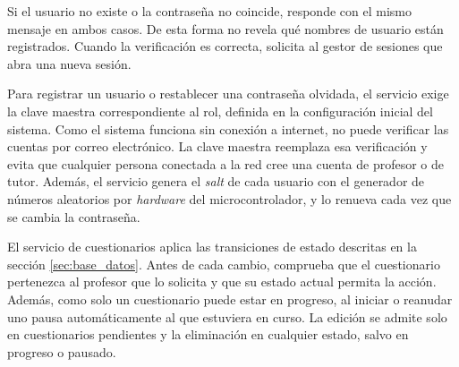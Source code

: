 Si el usuario no existe o la contraseña no coincide, responde con el mismo mensaje en ambos casos. De esta forma no revela qué nombres de usuario están registrados. Cuando la verificación es correcta, solicita al gestor de sesiones que abra una nueva sesión.



Para registrar un usuario o restablecer una contraseña olvidada, el servicio exige la clave maestra correspondiente al rol, definida en la configuración inicial del sistema. Como el sistema funciona sin conexión a internet, no puede verificar las cuentas por correo electrónico. La clave maestra reemplaza esa verificación y evita que cualquier persona conectada a la red cree una cuenta de profesor o de tutor. Además, el servicio genera el \emph{salt} de cada usuario con el generador de números aleatorios por \emph{hardware} del microcontrolador, y lo renueva cada vez que se cambia la contraseña.




El servicio de cuestionarios aplica las transiciones de estado descritas en la sección \ref{sec:base_datos}. Antes de cada cambio, comprueba que el cuestionario pertenezca al profesor que lo solicita y que su estado actual permita la acción. Además, como solo un cuestionario puede estar en progreso, al iniciar o reanudar uno pausa automáticamente al que estuviera en curso. La edición se admite solo en cuestionarios pendientes y la eliminación en cualquier estado, salvo en progreso o pausado.

